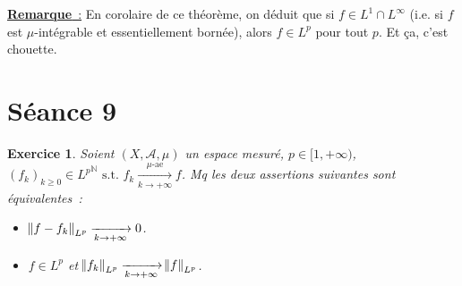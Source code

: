 \documentclass{article}
\newtheorem{ex}{Exercice}[section]
\newcommand{\pinfty}{{+\infty}}
\newcommand{\st}{\text{ s.t. }}
\newcommand{\N}{{\mathbb N}}
\begin{document}
\underline {\textbf {Remarque}~:} En corolaire de ce théorème, on déduit que si $f \in L^1 \cap L^\infty$ (i.e. si $f$ est $\mu$-intégrable et essentiellement bornée), alors
$f \in L^p$ pour tout $p$. Et ça, c'est chouette.

\newpage
\section{Séance 9}

\begin{ex} Soient $(X, \mathcal A, \mu)$ un espace mesuré, $p \in [1, \pinfty)$, $(f_k)_{k \geq 0} \in {L^p}^\N \st f_k \xrightarrow[k \to \pinfty]{\mu\text{-ae}} f$. Mq
les deux assertions suivantes sont équivalentes~:
\begin{itemize}
	\item[a)] $\norm {f-f_k}_{L^p} \xrightarrow[k \to \pinfty]{} 0$.
	\item[b)] $f \in L^p$ et $\norm {f_k}_{L^p} \xrightarrow[k \to \pinfty]{} \norm f_{L^p}$.
\end{itemize}
\end{ex}
\end{document}
